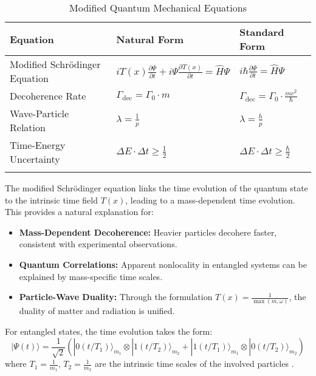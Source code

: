 \documentclass[12pt,a4paper]{article}
\newcommand{\Tfield}{T(x)}
\begin{document}
	\begin{table}[ht]
		\centering
		\begin{adjustbox}{scale=1.1}
			\begin{tabular}{lll}
				\hline
				\textbf{Equation} & \textbf{Natural Form} & \textbf{Standard Form} \\
				\hline
				Modified Schrödinger Equation & $i\Tfield\frac{\partial\Psi}{\partial t} + i\Psi\frac{\partial \Tfield}{\partial t} = \hat{H}\Psi$ & $i\hbar\frac{\partial\Psi}{\partial t} = \hat{H}\Psi$ \\
				Decoherence Rate & $\Gamma_{\text{dec}} = \Gamma_0 \cdot m$ & $\Gamma_{\text{dec}} = \Gamma_0 \cdot \frac{mc^2}{\hbar}$ \\
				Wave-Particle Relation & $\lambda = \frac{1}{p}$ & $\lambda = \frac{h}{p}$ \\
				Time-Energy Uncertainty & $\Delta E \cdot \Delta t \geq \frac{1}{2}$ & $\Delta E \cdot \Delta t \geq \frac{\hbar}{2}$ \\
				\hline
				\multicolumn{2}{c}{} \\
				\hline
			\end{tabular}
		\end{adjustbox}
		\caption{Modified Quantum Mechanical Equations}
		\label{tab:qm_equations}
	\end{table}
	
	The modified Schrödinger equation links the time evolution of the quantum state to the intrinsic time field $\Tfield$, leading to a mass-dependent time evolution. This provides a natural explanation for:
	
	\begin{itemize}
		\item \textbf{Mass-Dependent Decoherence:} Heavier particles decohere faster, consistent with experimental observations.
		\item \textbf{Quantum Correlations:} Apparent nonlocality in entangled systems can be explained by mass-specific time scales.
		\item \textbf{Particle-Wave Duality:} Through the formulation $\Tfield = \frac{1}{\max(m,\omega)}$, the duality of matter and radiation is unified.
	\end{itemize}
	
	For entangled states, the time evolution takes the form:
	\begin{equation}
		|\Psi(t)\rangle = \frac{1}{\sqrt{2}}\left(|0(t/T_1)\rangle_{m_1} \otimes |1(t/T_2)\rangle_{m_2} + |1(t/T_1)\rangle_{m_1} \otimes |0(t/T_2)\rangle_{m_2}\right)
	\end{equation}
	where $T_1 = \frac{1}{m_1}$, $T_2 = \frac{1}{m_2}$ are the intrinsic time scales of the involved particles \cite{pascher_quantum_2025, pascher_photons_2025}.
	
\end{document}
